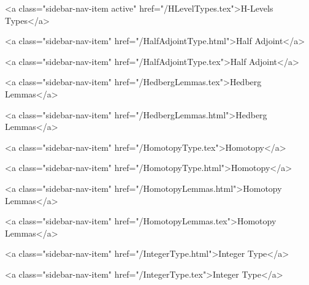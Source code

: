       
        
          <a class="sidebar-nav-item active" href="/HLevelTypes.tex">H-Levels Types</a>
        
      
    
      
        
          <a class="sidebar-nav-item" href="/HalfAdjointType.html">Half Adjoint</a>
        
      
    
      
        
          <a class="sidebar-nav-item" href="/HalfAdjointType.tex">Half Adjoint</a>
        
      
    
      
        
          <a class="sidebar-nav-item" href="/HedbergLemmas.tex">Hedberg Lemmas</a>
        
      
    
      
        
          <a class="sidebar-nav-item" href="/HedbergLemmas.html">Hedberg Lemmas</a>
        
      
    
      
        
          <a class="sidebar-nav-item" href="/HomotopyType.tex">Homotopy</a>
        
      
    
      
        
          <a class="sidebar-nav-item" href="/HomotopyType.html">Homotopy</a>
        
      
    
      
        
          <a class="sidebar-nav-item" href="/HomotopyLemmas.html">Homotopy Lemmas</a>
        
      
    
      
        
          <a class="sidebar-nav-item" href="/HomotopyLemmas.tex">Homotopy Lemmas</a>
        
      
    
      
        
          <a class="sidebar-nav-item" href="/IntegerType.html">Integer Type</a>
        
      
    
      
        
          <a class="sidebar-nav-item" href="/IntegerType.tex">Integer Type</a>
        
      
    
